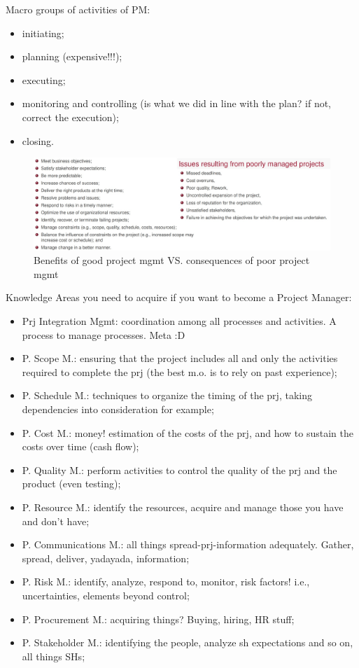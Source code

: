 \noindent Macro groups of activities of PM:
\begin{itemize}
    \item initiating;
    \item planning (expensive!!!);
    \item executing;
    \item monitoring and controlling (is what we did in line with the plan? if not, correct the execution);
    \item closing.
\end{itemize}
\begin{figure} [H]
    \centering
    \includegraphics[scale=0.42]{Figures/03/benefit_issues.jpg}
    \caption{Benefits of good project mgmt VS. consequences of poor project mgmt}
    \label{fig:pmbi}
\end{figure}
 Knowledge Areas you need to acquire if you want to become a Project Manager:
\begin{itemize}
    \item Prj Integration Mgmt: coordination among all processes and activities. A process to manage processes. Meta :D
    \item P. Scope M.: ensuring that the project includes all and only the activities required to complete the prj (the best m.o. is to rely on past experience);
    \item P. Schedule M.: techniques to organize the timing of the prj, taking dependencies into consideration for example;
    \item P. Cost M.: money! estimation of the costs of the prj, and how to sustain the costs over time (cash flow);
    \item P. Quality M.: perform activities to control the quality of the prj and the product (even testing);
    \item P. Resource M.: identify the resources, acquire and manage those you have and don't have;
    \item P. Communications M.: all things spread-prj-information adequately. Gather, spread, deliver, yadayada, information;
    \item P. Risk M.: identify, analyze, respond to, monitor, risk factors! i.e., uncertainties, elements beyond control;
    \item P. Procurement M.: acquiring things? Buying, hiring, HR stuff;
    \item P. Stakeholder M.: identifying the people, analyze sh expectations and so on, all things SHs;
\end{itemize}

